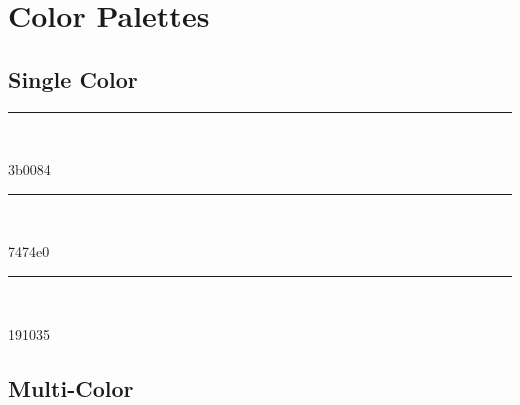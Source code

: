 \section{Color Palettes}

\newcommand\cp[1]{%
\textcolor[HTML]{#1}{\rule{10pt}{10pt}}
~\hspace{5pt}
~\parbox[c][10pt][c]{60pt}{#1}
}
\newcommand\csep{%
\hspace{1pt}
}

\subsection{Single Color}

\cp{3b0084}\csep
\cp{7474e0}\csep
\cp{191035}
\par

\subsection{Multi-Color}

